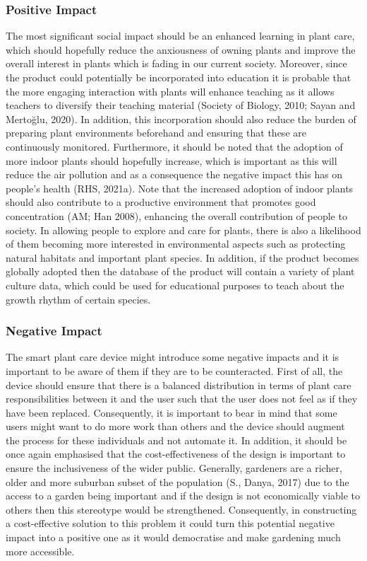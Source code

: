 \documentclass{article}
\begin{document}
\subsubsection{Positive Impact}

The most significant social impact should be an enhanced learning in plant care, which should hopefully reduce the anxiousness of owning plants and improve the overall interest in plants which is fading in our current society. Moreover, since the product could potentially be incorporated into education it is probable that the more engaging interaction with plants will enhance teaching as it allows teachers to diversify their teaching material (Society of Biology, 2010; Sayan and Mertoğlu, 2020). In addition, this incorporation should also reduce the burden of preparing plant environments beforehand and ensuring that these are continuously monitored. Furthermore, it should be noted that the adoption of more indoor plants should  hopefully increase, which is important as this will reduce the air pollution and as a consequence the negative impact this has on people’s health (RHS, 2021a). Note that the increased adoption of indoor plants should also contribute to a productive environment that promotes good concentration (AM; Han 2008), enhancing the overall contribution of people to society. In allowing people to explore and care for plants, there is also a likelihood of them becoming more interested in environmental aspects such as protecting natural habitats and important plant species. In addition, if the product becomes globally adopted then the database of the product will contain a variety of plant culture data, which could be used for educational purposes to teach about the growth rhythm of certain species.

\subsubsection{Negative Impact}
The smart plant care device might introduce some negative impacts and it is important to be aware of them if they are to be counteracted. First of all, the device should ensure that there is a balanced distribution in terms of plant care responsibilities between it and the user such that the user does not feel as if they have been replaced. Consequently, it is important to bear in mind that some users might want to do more work than others and the device should augment the process for these individuals and not automate it. In addition, it should be once again emphasised that the cost-effectiveness of the design is important to ensure the inclusiveness of the wider public. Generally, gardeners are a richer, older and more suburban subset of the population (S., Danya, 2017) due to the access to a garden being important and if the design is not economically viable to others then this stereotype would be strengthened. Consequently, in constructing a cost-effective solution to this problem it could turn this potential negative impact into a positive one as it would democratise and make gardening much more accessible.
 
\end{document}
